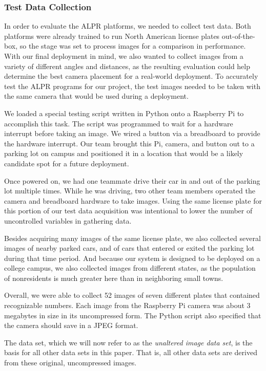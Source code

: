\documentclass[11pt, oneside, fullpage, doublespace]{article}
\begin{document}
\subsubsection{Test Data Collection}
In order to evaluate the ALPR platforms, we needed to collect test data. Both platforms were already trained to run North American license plates out-of-the-box, so the stage was set to process images for a comparison in performance. With our final deployment in mind, we also wanted to collect images from a variety of different angles and distances, as the resulting evaluation could help determine the best camera placement for a real-world deployment. To accurately test the ALPR programs for our project, the test images needed to be taken with the same camera that would be used during a deployment.

We loaded a special testing script written in Python onto a Raspberry Pi to accomplish this task. The script was programmed to wait for a hardware interrupt before taking an image. We wired a button via a breadboard to provide the hardware interrupt. Our team brought this Pi, camera, and button out to a parking lot on campus and positioned it in a location that would be a likely candidate spot for a future deployment.

Once powered on, we had one teammate drive their car in and out of the parking lot multiple times. While he was driving, two other team members operated the camera and breadboard hardware to take images. Using the same license plate for this portion of our test data acquisition was intentional to lower the number of uncontrolled variables in gathering data.

Besides acquiring many images of the same license plate, we also collected several images of nearby parked cars, and of cars that entered or exited the parking lot during that time period. And because our system is designed to be deployed on a college campus, we also collected images from different states, as the population of nonresidents is much greater here than in neighboring small towns.

Overall, we were able to collect 52 images of seven different plates that contained recognizable numbers. Each image from the Raspberry Pi camera was about 3 megabytes in size in its uncompressed form. The Python script also specified that the camera should save in a JPEG format.

The data set, which we will now refer to as the \emph{unaltered image data set}, is the basis for all other data sets in this paper. That is, all other data sets are derived from these original, uncompressed images. 
\end{document}
